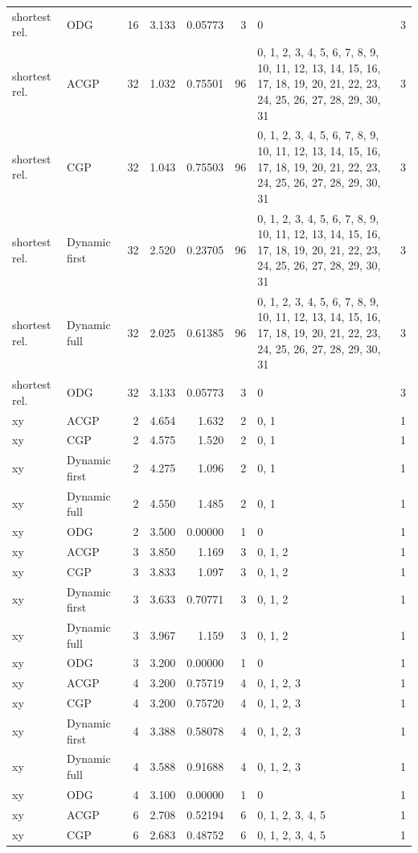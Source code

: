 \documentclass[10pt,a4paper]{article}
\begin{document}
\begin{longtable}{@{}p{23mm}p{29mm}rrrrp{36mm}r@{}}
shortest rel. & ODG & 16 & 3.133 & 0.05773 & 3 & 0 & 3 \\
shortest rel. & ACGP & 32 & 1.032 & 0.75501 & 96 & 0, 1, 2, 3, 4, 5, 6, 7, 8, 9, 10, 11, 12, 13, 14, 15, 16, 17, 18, 19, 20, 21, 22, 23, 24, 25, 26, 27, 28, 29, 30, 31 & 3 \\
shortest rel. & CGP & 32 & 1.043 & 0.75503 & 96 & 0, 1, 2, 3, 4, 5, 6, 7, 8, 9, 10, 11, 12, 13, 14, 15, 16, 17, 18, 19, 20, 21, 22, 23, 24, 25, 26, 27, 28, 29, 30, 31 & 3 \\
shortest rel. & Dynamic first & 32 & 2.520 & 0.23705 & 96 & 0, 1, 2, 3, 4, 5, 6, 7, 8, 9, 10, 11, 12, 13, 14, 15, 16, 17, 18, 19, 20, 21, 22, 23, 24, 25, 26, 27, 28, 29, 30, 31 & 3 \\
shortest rel. & Dynamic full & 32 & 2.025 & 0.61385 & 96 & 0, 1, 2, 3, 4, 5, 6, 7, 8, 9, 10, 11, 12, 13, 14, 15, 16, 17, 18, 19, 20, 21, 22, 23, 24, 25, 26, 27, 28, 29, 30, 31 & 3 \\
shortest rel. & ODG & 32 & 3.133 & 0.05773 & 3 & 0 & 3 \\
xy & ACGP & 2 & 4.654 & 1.632 & 2 & 0, 1 & 1 \\
xy & CGP & 2 & 4.575 & 1.520 & 2 & 0, 1 & 1 \\
xy & Dynamic first & 2 & 4.275 & 1.096 & 2 & 0, 1 & 1 \\
xy & Dynamic full & 2 & 4.550 & 1.485 & 2 & 0, 1 & 1 \\
xy & ODG & 2 & 3.500 & 0.00000 & 1 & 0 & 1 \\
xy & ACGP & 3 & 3.850 & 1.169 & 3 & 0, 1, 2 & 1 \\
xy & CGP & 3 & 3.833 & 1.097 & 3 & 0, 1, 2 & 1 \\
xy & Dynamic first & 3 & 3.633 & 0.70771 & 3 & 0, 1, 2 & 1 \\
xy & Dynamic full & 3 & 3.967 & 1.159 & 3 & 0, 1, 2 & 1 \\
xy & ODG & 3 & 3.200 & 0.00000 & 1 & 0 & 1 \\
xy & ACGP & 4 & 3.200 & 0.75719 & 4 & 0, 1, 2, 3 & 1 \\
xy & CGP & 4 & 3.200 & 0.75720 & 4 & 0, 1, 2, 3 & 1 \\
xy & Dynamic first & 4 & 3.388 & 0.58078 & 4 & 0, 1, 2, 3 & 1 \\
xy & Dynamic full & 4 & 3.588 & 0.91688 & 4 & 0, 1, 2, 3 & 1 \\
xy & ODG & 4 & 3.100 & 0.00000 & 1 & 0 & 1 \\
xy & ACGP & 6 & 2.708 & 0.52194 & 6 & 0, 1, 2, 3, 4, 5 & 1 \\
xy & CGP & 6 & 2.683 & 0.48752 & 6 & 0, 1, 2, 3, 4, 5 & 1 \\

\end{longtable}
\end{document}
